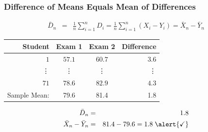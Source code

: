 \begin{frame}
\frametitle{Difference of Means Equals Mean of Differences}

\small

\begin{eqnarray*}
	\bar{D}_n &=& \frac{1}{n}\sum_{i=1}^n D_i = \frac{1}{n}\sum_{i=1}^n (X_i - Y_i) = \bar{X}_n - \bar{Y}_n
\end{eqnarray*}

%
\begin{table}[!tbp]
\begin{center}
\begin{tabular}{rccr}
\hline\hline
\multicolumn{1}{r}{Student}&\multicolumn{1}{c}{Exam 1}&\multicolumn{1}{c}{Exam 2}&\multicolumn{1}{r}{Difference}\tabularnewline
\hline
$ 1$&$57.1$&$60.7$&$  3.6$\tabularnewline
\vdots&\vdots&\vdots&\vdots\\
$71$&$78.6$&$82.9$&$  4.3$\tabularnewline
\hline
Sample Mean: & 79.6 & 81.4  &1.8\\
\hline
\end{tabular}
\end{center}
\end{table}


\begin{eqnarray*}
	\bar{D}_n &=& 1.8\\ 
	\bar{X}_n - \bar{Y}_n &=&  81.4 - 79.6 =   1.8  \;\alert{\checkmark}
\end{eqnarray*}

\end{frame}


